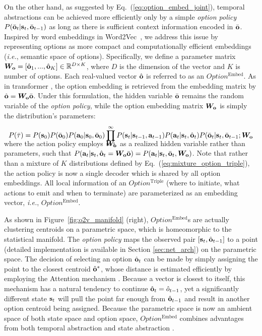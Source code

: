 \documentclass{article}
\begin{document}
On the other hand, as suggested by
Eq.~(\ref{eq:option_embed_joint}), temporal abstractions can be
achieved more efficiently only by a simple \emph{option
  policy} $P(\bar{{\mathbf{o}}}_t|{\mathbf{s}}_t,\bar{{\mathbf{o}}}_{t-1})$ as long as
there is sufficient context information encoded in $\bar{{\mathbf{o}}}$.
Inspired by word embeddings in
Word2Vec~\cite{mikolov2013distributed}, we address this issue by
representing options as more compact and computationally
efficient embeddings (\textit{i.e.}, semantic space of options).
Specifically, we define a parameter matrix
${\bm{W}}_{\mathbf{o}}=[\hat{{\mathbf{o}}}_1,...,\hat{{\mathbf{o}}}_K]\in{\mathbb{R}}^{D\times K}$,
where $D$ is the dimension of the vector and $K$ is number of
options. Each real-valued vector $\hat{{\mathbf{o}}}$ is referred to as
an $Option^{\textrm{Embed}}$. As in transformer
\cite{vaswani2017attention}, the option embedding is retrieved
from the embedding matrix by $\hat{{\mathbf{o}}}={\bm{W}}_{{\mathbf{o}}}\bar{{\mathbf{o}}}$.
Under this formulation, the hidden variable $\bar{{\mathbf{o}}}$ remains 
the random variable of the \emph{option policy}, while the option 
embedding matrix ${\bm{W}}_{{\mathbf{o}}}$ is simply the distribution's parameters:
\begin{align}
  \label{eq:option_hat_joint}
  P(\bar{\tau}) =    
  P({\mathbf{s}}_0)P(\bar{{\mathbf{o}}}_0)P({\mathbf{a}}_0|{\mathbf{s}}_0,\bar{{\mathbf{o}}}_0)
  \prod_{t=1}^\infty P({\mathbf{s}}_t|{\mathbf{s}}_{t-1},{\mathbf{a}}_{t-1})
  P({\mathbf{a}}_{t}|{\mathbf{s}}_{t},\hat{{\mathbf{o}}}_{t})P(\bar{{\mathbf{o}}}_t|{\mathbf{s}}_t,\bar{{\mathbf{o}}}_{t-1};{\bm{W}}_{{\mathbf{o}}}\nonumber\\[-2em]
\end{align}
where the action policy employs ${\bm{W}}_{{\mathbf{o}}}$ as a realized hidden
variable rather than parameters, such that
$P({\mathbf{a}}_{t}|{\mathbf{s}}_{t},\hat{{\mathbf{o}}}_{t}={\bm{W}}_{{\mathbf{o}}}\bar{{\mathbf{o}}})=P({\mathbf{a}}_{t}|{\mathbf{s}}_{t},\bar{{\mathbf{o}}}_{t},{\bm{W}}_{{\mathbf{o}}})$.
Note that rather than a mixture of $K$ distributions defined by
Eq.~(\ref{eq:mixture_option_triple}), the action policy is now a
single decoder which is shared by all option embeddings. All
local information of an $Option^{\textrm{Triple}}$ (where to initiate,
what actions to emit and when to terminate) are parameterized as
an embedding vector, \textit{i.e.},
$Option^{\textrm{Embed}}$.

As shown in Figure~\ref{fig:o2v_manifold} (right), $Option^{\textrm{Embed}}$s are
actually clustering centroids on a parametric space, which is
homeomorphic to the statistical manifold. The \emph{option
  policy} maps the observed pair $[{\mathbf{s}}_t,\hat{{\mathbf{o}}}_{t-1}]$ to a
point (detailed implementation is available in Section \ref{sec:net_arch})
on the parametric space. The decision of selecting an option
$\hat{{\mathbf{o}}}_t$ can be made by simply assigning the point to the
closest centroid $\hat{{\mathbf{o}}}^*$, whose distance is estimated
efficiently by employing the Attention mechanism
\cite{vaswani2017attention}. Because a vector is closest to
itself, this mechanism has a natural tendency to continue
$\hat{{\mathbf{o}}}_t=\hat{o}_{t-1}$, yet a significantly different state
${\mathbf{s}}_t$ will pull the point far enough from $\hat{{\mathbf{o}}}_{t-1}$
and result in another option centroid being assigned. Because the
parametric space is now an ambient space of both state space and
option space, $Option^{\textrm{Embed}}$ combines advantages from both
temporal abstraction and state abstraction
\cite{knoblock1990learning}.
\end{document}
